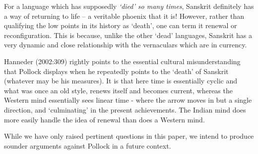 For a language which has supposedly {\sl ‘died’ so many times}, Sanskrit definitely has a way of returning to life – a veritable phoenix that it is! However, rather than qualifying the low points in its history as ‘death’, one can term it renewal or reconfiguration. This is because, unlike the other ‘dead’ languages, Sanskrit has a very dynamic and close relationship with the vernaculars which are in currency.

Hanneder (2002:309) rightly points to the essential cultural misunderstanding that Pollock displays when he repeatedly points to the ‘death’ of Sanskrit (whatever may be his measures). It is that here time is essentially cyclic and what was once an old style, renews itself and becomes current, whereas the Western mind essentially sees linear time - where the arrow moves in but a single direction, and ‘culminating’ in the present achievements. The Indian mind does more easily handle the idea of renewal than does a Western mind.

While we have only raised pertinent questions in this paper, we intend to produce sounder arguments against Pollock in a future context.

